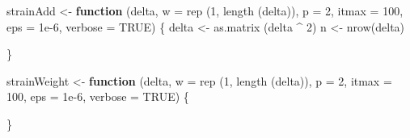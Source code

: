 \documentclass[
  12pt,
]{book}
\newenvironment{Shaded}{\begin{snugshade}}{\end{snugshade}}
\newcommand{\AttributeTok}[1]{\textcolor[rgb]{0.77,0.63,0.00}{#1}}
\newcommand{\ConstantTok}[1]{\textcolor[rgb]{0.00,0.00,0.00}{#1}}
\newcommand{\ControlFlowTok}[1]{\textcolor[rgb]{0.13,0.29,0.53}{\textbf{#1}}}
\newcommand{\DecValTok}[1]{\textcolor[rgb]{0.00,0.00,0.81}{#1}}
\newcommand{\FloatTok}[1]{\textcolor[rgb]{0.00,0.00,0.81}{#1}}
\newcommand{\FunctionTok}[1]{\textcolor[rgb]{0.00,0.00,0.00}{#1}}
\newcommand{\NormalTok}[1]{#1}
\newcommand{\OtherTok}[1]{\textcolor[rgb]{0.56,0.35,0.01}{#1}}
\newcommand{\SpecialCharTok}[1]{\textcolor[rgb]{0.00,0.00,0.00}{#1}}
\theoremstyle{definition}
\theoremstyle{definition}
\theoremstyle{definition}
\theoremstyle{definition}
\theoremstyle{remark}
\begin{document}
\begin{Shaded}
\begin{Highlighting}[]
\NormalTok{strainAdd }\OtherTok{\textless{}{-}}
  \ControlFlowTok{function}\NormalTok{ (delta,}
            \AttributeTok{w =} \FunctionTok{rep}\NormalTok{ (}\DecValTok{1}\NormalTok{, }\FunctionTok{length}\NormalTok{ (delta)),}
            \AttributeTok{p =} \DecValTok{2}\NormalTok{,}
            \AttributeTok{itmax =} \DecValTok{100}\NormalTok{,}
            \AttributeTok{eps =} \FloatTok{1e{-}6}\NormalTok{,}
            \AttributeTok{verbose =} \ConstantTok{TRUE}\NormalTok{) \{}
\NormalTok{    delta }\OtherTok{\textless{}{-}} \FunctionTok{as.matrix}\NormalTok{ (delta }\SpecialCharTok{\^{}} \DecValTok{2}\NormalTok{)}
\NormalTok{    n }\OtherTok{\textless{}{-}} \FunctionTok{nrow}\NormalTok{(delta)}
    
\NormalTok{  \}}

\NormalTok{strainWeight }\OtherTok{\textless{}{-}}
  \ControlFlowTok{function}\NormalTok{ (delta,}
            \AttributeTok{w =} \FunctionTok{rep}\NormalTok{ (}\DecValTok{1}\NormalTok{, }\FunctionTok{length}\NormalTok{ (delta)),}
            \AttributeTok{p =} \DecValTok{2}\NormalTok{,}
            \AttributeTok{itmax =} \DecValTok{100}\NormalTok{,}
            \AttributeTok{eps =} \FloatTok{1e{-}6}\NormalTok{,}
            \AttributeTok{verbose =} \ConstantTok{TRUE}\NormalTok{) \{}
    
\NormalTok{  \}}


\end{Highlighting}
\end{Shaded}
\end{document}
